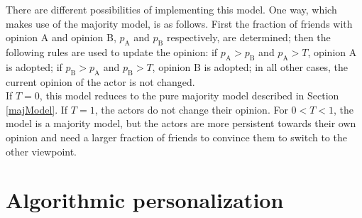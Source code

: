 \documentclass[11 pt , letterpaper , twoside , openright]{book}
\begin{document}
\newline
There are different possibilities of implementing this model. One way, which makes use of the majority model, is as follows. First the fraction of friends with opinion A and opinion B, $p_\text{A}$ and $p_\text{B}$ respectively, are determined; then the following rules are used to update the opinion: if $p_\text{A} > p_\text{B}$ and $p_\text{A} > T$, opinion A is adopted; if $p_\text{B} > p_\text{A}$ and $p_\text{B} > T$, opinion B is adopted; in all other cases, the current opinion of the actor is not changed.\\
\newline
If $T = 0$, this model reduces to the pure majority model described in Section \ref{majModel}. If $T = 1$, the actors do not change their opinion. For $0 < T < 1$, the model is a majority model, but the actors are more persistent towards their own opinion and need a larger fraction of friends to convince them to switch to the other viewpoint.

\section{Algorithmic personalization}\label{filter}
\end{document}

